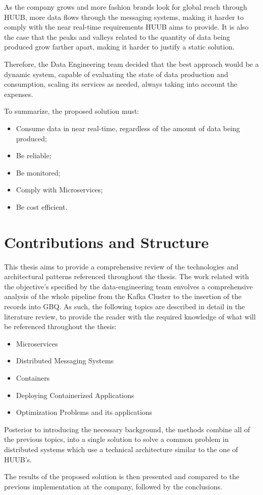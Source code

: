 As the company grows and more fashion brands look for global reach through HUUB, more data flows through the messaging systems, making it harder to comply with the near real-time requirements HUUB aims to provide. It is also the case that the peaks and valleys related to the quantity of data being produced grow farther apart, making it harder to justify a static solution.

Therefore, the Data Engineering team decided that the best approach would be a dynamic system, capable of evaluating the state of data production and consumption, scaling its services as needed, always taking into account the expenses.

To summarize, the proposed solution must:
\begin{itemize}
    \item Consume data in near real-time, regardless of the amount of data being produced;
    \item Be reliable;
    \item Be monitored;
    \item Comply with Microservices;
    \item Be cost efficient.
\end{itemize}


\section{Contributions and Structure} \label{sec:contributions}

This thesis aims to provide a comprehensive review of the technologies and architectural patterns referenced throughout the thesis. The work related with the objective's specified by the data-engineering team envolves a comprehensive analysis of the whole pipeline from the Kafka Cluster to the insertion of the records into GBQ. As such, the following topics are described in detail in the literature review, to provide the reader with the required knowledge of what will be referenced throughout the thesis:
\begin{itemize}
    \item Microservices
    \item Distributed Messaging Systems
    \item Containers
    \item Deploying Containerized Applications
    \item Optimization Problems and its applications
\end{itemize}

Posterior to introducing the necessary background, the methods combine all of the previous topics, into a single solution to solve a common problem in distributed systems which use a technical architecture similar to the one of HUUB's.

The results of the proposed solution is then presented and compared to the previous implementation at the company, followed by the conclusions.